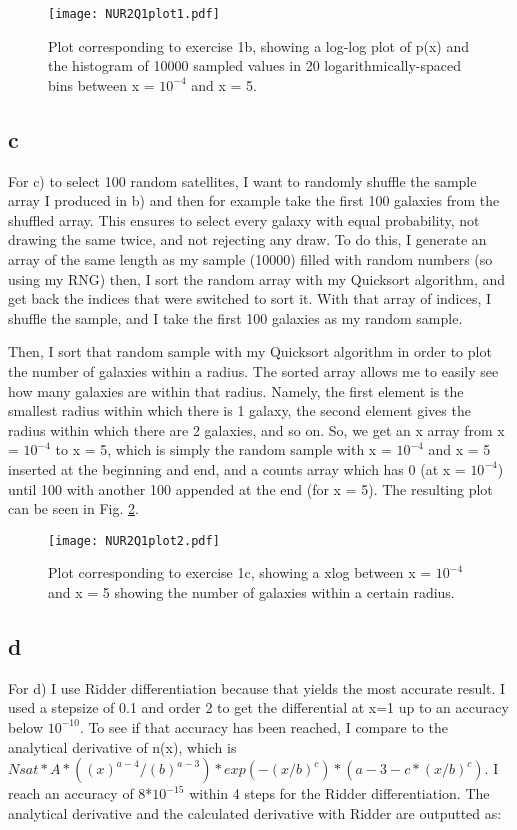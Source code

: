 \begin{figure}[h!]
  \centering
  \texttt{[image: NUR2Q1plot1.pdf]}
  \caption{Plot corresponding to exercise 1b, showing a log-log plot of p(x) and the histogram of 10000 
  sampled values in 20 logarithmically-spaced bins between x = $10^{-4}$ and x = 5.}
  \label{fig:fig1}
\end{figure} 


\subsection{c}

For c) to select 100 random satellites, I want to randomly shuffle the sample array I produced in b) and then for 
example take the first 100 galaxies from the shuffled array. This ensures to select every galaxy with equal
probability, not drawing the same twice, and not rejecting any draw. 
To do this, I generate an array of the same length as my sample (10000) filled with random numbers (so using my RNG)
then, I sort the random array with my Quicksort algorithm, and get back the indices that were switched to sort it.
With that array of indices, I shuffle the sample, and I take the first 100 galaxies as my random sample.

Then, I sort that random sample with my Quicksort algorithm in order to plot the number of galaxies within a radius.
The sorted array allows me to easily see how many galaxies are within that radius. 
Namely, the first element is the smallest radius within which there is 1 galaxy, the second element gives the radius 
within which there are 2 galaxies, and so on. 
So, we get an x array from x = $10^{-4}$ to x = 5, which is simply the random sample with 
x = $10^{-4}$ and x = 5 inserted at the beginning and end, and a counts array which has 0 (at x = $10^{-4}$) 
until 100 with another 100 appended at the end (for x = 5). 
The resulting plot can be seen in Fig. \ref{fig:fig2}.


\begin{figure}[h!]
  \centering
  \texttt{[image: NUR2Q1plot2.pdf]}
  \caption{Plot corresponding to exercise 1c, showing a xlog between x = $10^{-4}$ and x = 5 showing the 
number of galaxies within a certain radius.}
  \label{fig:fig2}
\end{figure} 


\subsection{d}

For d) I use Ridder differentiation because that yields the most accurate result. I used a stepsize of 0.1
and order 2 to get the differential at x=1 up to an accuracy below $10^{-10}$. To see if that accuracy has been
reached, I compare to the analytical derivative of n(x), which is 
$Nsat* A*((x)^{a-4}/(b)^{a-3})*exp(-(x/b)^c)*(a-3-c*(x/b)^c)$.
I reach an accuracy of 8*$10^{-15}$ within 4 steps for the Ridder differentiation.
The analytical derivative and the calculated derivative with Ridder are outputted as:




